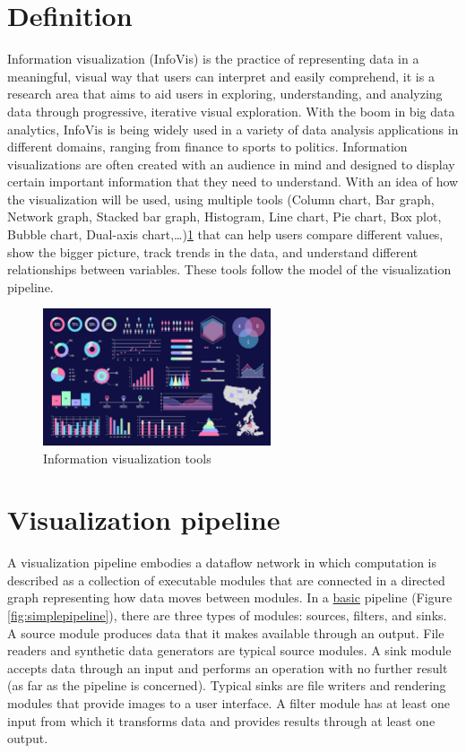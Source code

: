\section{Definition}
Information visualization (InfoVis) is the practice of representing data in a meaningful, visual way that users can interpret and easily comprehend, it is a research area that aims to aid users in exploring, understanding, and analyzing data through progressive, iterative visual exploration. With the boom in big data analytics, InfoVis is being widely used in a variety of data analysis applications in different domains, ranging from finance to sports to politics\cite{liuSurveyInformationVisualization2014}.
\bigbreak
Information visualizations are often created with an audience in mind and designed to display certain important information that they need to understand. With an idea of how the visualization will be used, using multiple tools (Column chart, Bar graph, Network graph, Stacked bar graph, Histogram, Line chart, Pie chart, Box plot, Bubble chart,  Dual-axis chart,…)\ref{fig:infoViseType} that can help users compare different values, show the bigger picture, track trends in the data, and understand different relationships between variables\cite{WhatInformationVisualization}. These tools follow the model of the visualization pipeline. 

\begin{figure}[h!]
  \center
  \includegraphics[width=0.60\textwidth]{images/chapter2/types-of-data-visualization.jpg}
  \caption{Information visualization tools}
  \label{fig:infoViseType}
\end{figure}

\section{Visualization pipeline}
\label{sec:visualization_pipeline}
A visualization pipeline embodies a dataflow network in which computation is described as a collection of executable modules that are connected in a directed graph representing how data moves between modules. In a \underline{basic} pipeline (Figure \ref{fig:simplepipeline}), there are three types of modules: sources, filters, and sinks. A source module produces data that it makes available through an output. File readers and synthetic data generators are typical source modules. A sink module accepts data through an input and performs an operation with no further result (as far as the pipeline is concerned). Typical sinks are file writers and rendering modules that provide images to a user interface. A filter module has at least one input from which it transforms data and provides results through at least one output\cite{morelandSurveyVisualizationPipelines2013}.

